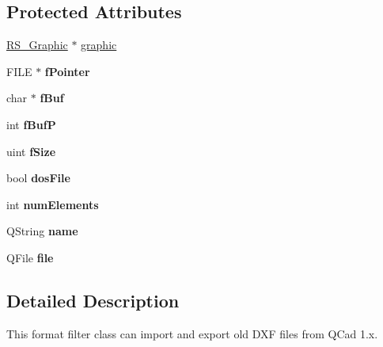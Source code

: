 \subsection*{Protected Attributes}
\begin{DoxyCompactItemize}
\item 
\hyperlink{classRS__Graphic}{R\-S\-\_\-\-Graphic} $\ast$ \hyperlink{classRS__FilterDXF1_a51669658011c6b6727b45169c53ddf36}{graphic}
\item 
\hypertarget{classRS__FilterDXF1_a3906b584ac2e4bc1c5c7ab5caa329e82}{F\-I\-L\-E $\ast$ {\bfseries f\-Pointer}}\label{classRS__FilterDXF1_a3906b584ac2e4bc1c5c7ab5caa329e82}

\item 
\hypertarget{classRS__FilterDXF1_abb59f92ae659fd8e2311d29158dd83c6}{char $\ast$ {\bfseries f\-Buf}}\label{classRS__FilterDXF1_abb59f92ae659fd8e2311d29158dd83c6}

\item 
\hypertarget{classRS__FilterDXF1_aa7a5dc68f7b039e0d3076fd78b28d30a}{int {\bfseries f\-Buf\-P}}\label{classRS__FilterDXF1_aa7a5dc68f7b039e0d3076fd78b28d30a}

\item 
\hypertarget{classRS__FilterDXF1_a2a16559f5c64db7ef2ad47f11f8d3821}{uint {\bfseries f\-Size}}\label{classRS__FilterDXF1_a2a16559f5c64db7ef2ad47f11f8d3821}

\item 
\hypertarget{classRS__FilterDXF1_a93e47fb906c197bd79e240276f87ad8e}{bool {\bfseries dos\-File}}\label{classRS__FilterDXF1_a93e47fb906c197bd79e240276f87ad8e}

\item 
\hypertarget{classRS__FilterDXF1_a7d9b8828380221e43703184d65e5c581}{int {\bfseries num\-Elements}}\label{classRS__FilterDXF1_a7d9b8828380221e43703184d65e5c581}

\item 
\hypertarget{classRS__FilterDXF1_acf2d7a5f1c1504d060d1d1221b95b246}{Q\-String {\bfseries name}}\label{classRS__FilterDXF1_acf2d7a5f1c1504d060d1d1221b95b246}

\item 
\hypertarget{classRS__FilterDXF1_a34a00cbd818a65679e90c381a1d963a7}{Q\-File {\bfseries file}}\label{classRS__FilterDXF1_a34a00cbd818a65679e90c381a1d963a7}

\end{DoxyCompactItemize}


\subsection{Detailed Description}
This format filter class can import and export old D\-X\-F files from Q\-Cad 1.\-x.

